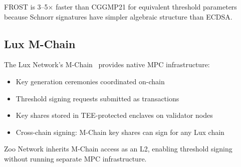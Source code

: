 FROST is 3--5$\times$ faster than CGGMP21 for equivalent threshold parameters because Schnorr signatures have simpler algebraic structure than ECDSA.

\subsection{Lux M-Chain}

The Lux Network's M-Chain~\cite{lux-mchain-mpc} provides native MPC infrastructure:

\begin{itemize}
    \item Key generation ceremonies coordinated on-chain
    \item Threshold signing requests submitted as transactions
    \item Key shares stored in TEE-protected enclaves on validator nodes
    \item Cross-chain signing: M-Chain key shares can sign for any Lux chain
\end{itemize}

Zoo Network inherits M-Chain access as an L2, enabling threshold signing without running separate MPC infrastructure.

